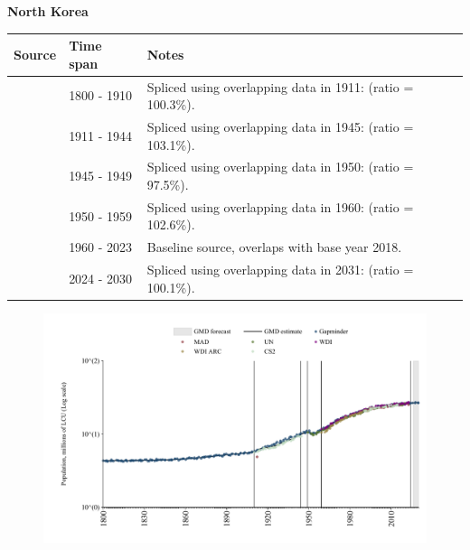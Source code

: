 \documentclass[12pt,a4paper,landscape]{article}
\begin{document}
\begin{adjustbox}{max totalsize={\paperwidth}{\paperheight},center}
\begin{minipage}[t][\textheight][t]{\textwidth}
\vspace*{0.5cm}
{}
\begin{center}
{\Large\bfseries North Korea}
\end{center}
\vspace{0.5cm}
\begin{table}[H]
\centering
\small
\begin{tabular}{|l|l|l|}
\hline
\textbf{Source} & \textbf{Time span} & \textbf{Notes} \\
\hline
\rowcolor{white}\cite{Gapminder}& 1800 - 1910 &Spliced using overlapping data in 1911: (ratio = 100.3\%).\\
\rowcolor{lightgray}\cite{CS2_PRK}& 1911 - 1944 &Spliced using overlapping data in 1945: (ratio = 103.1\%).\\
\rowcolor{white}\cite{Gapminder}& 1945 - 1949 &Spliced using overlapping data in 1950: (ratio = 97.5\%).\\
\rowcolor{lightgray}\cite{UN}& 1950 - 1959 &Spliced using overlapping data in 1960: (ratio = 102.6\%).\\
\rowcolor{white}\cite{WDI}& 1960 - 2023 &Baseline source, overlaps with base year 2018.\\
\rowcolor{lightgray}\cite{Gapminder}& 2024 - 2030 &Spliced using overlapping data in 2031: (ratio = 100.1\%).\\
\hline
\end{tabular}
\end{table}
\begin{figure}[H]
\centering
\includegraphics[width=\textwidth,height=0.6\textheight,keepaspectratio]{graphs/PRK_pop.pdf}
\end{figure}
\end{minipage}
\end{adjustbox}
\end{document}
